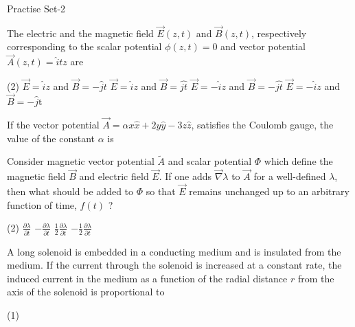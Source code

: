\newpage
\begin{abox}
	Practise Set-2
\end{abox}
\begin{enumerate}
	\begin{minipage}{\textwidth}
		\item  The electric and the magnetic field $\vec{E}(z, t)$ and $\vec{B}(z, t)$, respectively corresponding to the scalar potential $\phi(z, t)=0$ and vector potential $\vec{A}(z, t)=\hat{i} t z$ are
	\end{minipage}
	\begin{tasks}(2)
		\task[\textbf{A.}] $\vec{E}=\hat{i} z$ and $\vec{B}=-\hat{j} t$
		\task[\textbf{B.}]$\vec{E}=\hat{i} z$ and $\vec{B}=\hat{j t}$
		\task[\textbf{C.}]$\vec{E}=-\hat{i} z$ and $\vec{B}=-\hat{j t}$
		\task[\textbf{D.}]$\vec{E}=-\hat{i} z$ and $\vec{B}=-\hat{j} \mathrm{t}$
	\end{tasks}
	\begin{minipage}{\textwidth}
		\item If the vector potential $\vec{A}=\alpha x \hat{x}+2 y \hat{y}-3 z \hat{z}$, satisfies the Coulomb gauge, the value of the constant $\alpha$ is
	\end{minipage}
	\begin{minipage}{\textwidth}
		\item Consider magnetic vector potential $\tilde{A}$ and scalar potential $\Phi$ which define the magnetic field $\vec{B}$ and electric field $\vec{E}$. If one adds $\vec{\nabla} \lambda$ to $\vec{A}$ for a well-defined $\lambda$, then what should be added to $\Phi$ so that $\vec{E}$ remains unchanged up to an arbitrary function of time, $f(t)$ ?
	\end{minipage}
	\begin{tasks}(2)
		\task[\textbf{A.}] $\frac{\partial \lambda}{\partial t}$
		\task[\textbf{B.}]$-\frac{\partial \lambda}{\partial t}$
		\task[\textbf{C.}]$\frac{1}{2} \frac{\partial \lambda}{\partial t}$
		\task[\textbf{D.}]$-\frac{1}{2} \frac{\partial \lambda}{\partial t}$
	\end{tasks}
	\item A long solenoid is embedded in a conducting medium and is insulated from the medium. If the current through the solenoid is increased at a constant rate, the induced current in the medium as a function of the radial distance $r$ from the axis of the solenoid is proportional to
	{}
	\begin{tasks}(1)

\end{tasks}
\end{enumerate}
